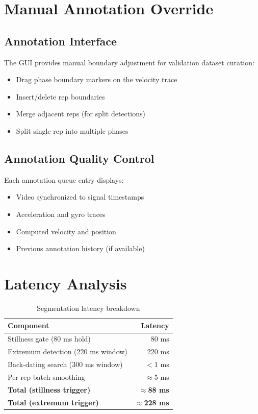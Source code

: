 \section{Manual Annotation Override}

\subsection{Annotation Interface}

The GUI provides manual boundary adjustment for validation dataset curation:

\begin{itemize}
    \item Drag phase boundary markers on the velocity trace
    \item Insert/delete rep boundaries
    \item Merge adjacent reps (for split detections)
    \item Split single rep into multiple phases
\end{itemize}

\subsection{Annotation Quality Control}

Each annotation queue entry displays:
\begin{itemize}
    \item Video synchronized to signal timestamps
    \item Acceleration and gyro traces
    \item Computed velocity and position
    \item Previous annotation history (if available)
\end{itemize}

\section{Latency Analysis}

\begin{table}[h]
    \centering
    \caption{Segmentation latency breakdown}
    \label{tab:seg_latency}
    \begin{tabular}{lr}
        \toprule
        \textbf{Component} & \textbf{Latency} \\
        \midrule
        Stillness gate (80 ms hold) & 80 ms \\
        Extremum detection (220 ms window) & 220 ms \\
        Back-dating search (300 ms window) & $<$1 ms \\
        Per-rep batch smoothing & $\approx$5 ms \\
        \midrule
        \textbf{Total (stillness trigger)} & \textbf{$\approx$88 ms} \\
        \textbf{Total (extremum trigger)} & \textbf{$\approx$228 ms} \\
        \bottomrule
    \end{tabular}
\end{table}

